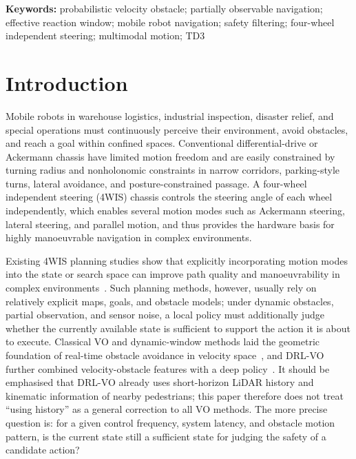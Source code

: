 \documentclass[10pt,a4paper,twocolumn]{article}
\begin{document}
\textbf{Keywords:} probabilistic velocity obstacle; partially observable navigation; effective reaction window; mobile robot navigation; safety filtering; four-wheel independent steering; multimodal motion; TD3

\section{Introduction}

Mobile robots in warehouse logistics, industrial inspection, disaster relief, and special operations must continuously perceive their environment, avoid obstacles, and reach a goal within confined spaces. Conventional differential-drive or Ackermann chassis have limited motion freedom and are easily constrained by turning radius and nonholonomic constraints in narrow corridors, parking-style turns, lateral avoidance, and posture-constrained passage. A four-wheel independent steering (4WIS) chassis controls the steering angle of each wheel independently, which enables several motion modes such as Ackermann steering, lateral steering, and parallel motion, and thus provides the hardware basis for highly manoeuvrable navigation in complex environments.

Existing 4WIS planning studies show that explicitly incorporating motion modes into the state or search space can improve path quality and manoeuvrability in complex environments~\cite{bao2025hybrid}. Such planning methods, however, usually rely on relatively explicit maps, goals, and obstacle models; under dynamic obstacles, partial observation, and sensor noise, a local policy must additionally judge whether the currently available state is sufficient to support the action it is about to execute. Classical VO and dynamic-window methods laid the geometric foundation of real-time obstacle avoidance in velocity space~\cite{fiorini1998vo,fox1997dwa}, and DRL-VO further combined velocity-obstacle features with a deep policy~\cite{xie2023drlvo}. It should be emphasised that DRL-VO already uses short-horizon LiDAR history and kinematic information of nearby pedestrians; this paper therefore does not treat ``using history'' as a general correction to all VO methods. The more precise question is: for a given control frequency, system latency, and obstacle motion pattern, is the current state still a sufficient state for judging the safety of a candidate action?
\end{document}
